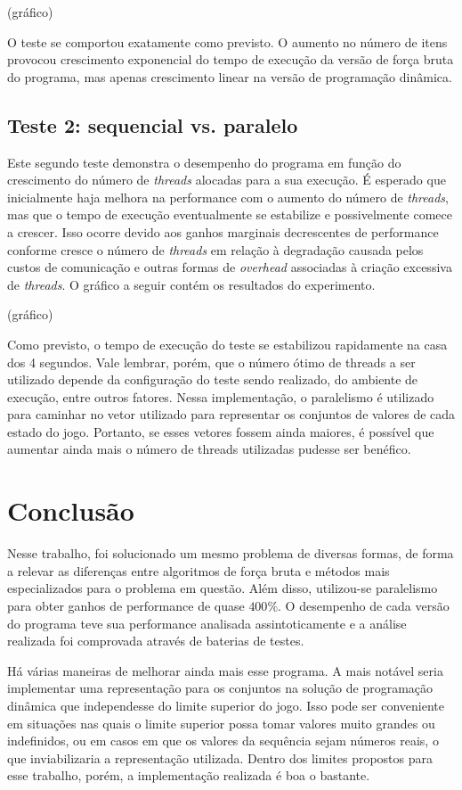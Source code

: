 \documentclass[10pt,a4paper]{article}
\numberwithin{equation}{section}
\begin{document}
(gráfico)

O teste se comportou exatamente como previsto. O aumento no número de itens provocou crescimento exponencial do tempo de execução da versão de força bruta do programa, mas apenas crescimento linear na versão de programação dinâmica.

\subsection{Teste 2: sequencial vs. paralelo}

Este segundo teste demonstra o desempenho do programa em função do crescimento do número de \emph{threads} alocadas para a sua execução. É esperado que inicialmente haja melhora na performance com o aumento do número de \emph{threads}, mas que o tempo de execução eventualmente se estabilize e possivelmente comece a crescer. Isso ocorre devido aos ganhos marginais decrescentes de performance conforme cresce o número de \emph{threads} em relação à degradação causada pelos custos de comunicação e outras formas de \emph{overhead} associadas à criação excessiva de \emph{threads}. O gráfico a seguir contém os resultados do experimento.

(gráfico)

Como previsto, o tempo de execução do teste se estabilizou rapidamente na casa dos 4 segundos. Vale lembrar, porém, que o número ótimo de threads a ser utilizado depende da configuração do teste sendo realizado, do ambiente de execução, entre outros fatores. Nessa implementação, o paralelismo é utilizado para caminhar no vetor utilizado para representar os conjuntos de valores de cada estado do jogo. Portanto, se esses vetores fossem ainda maiores, é possível que aumentar ainda mais o número de threads utilizadas pudesse ser benéfico.

\section{Conclusão}

Nesse trabalho, foi solucionado um mesmo problema de diversas formas, de forma a relevar as diferenças entre algoritmos de força bruta e métodos mais especializados para o problema em questão. Além disso, utilizou-se paralelismo para obter ganhos de performance de quase $400\%$. O desempenho de cada versão do programa teve sua performance analisada assintoticamente e a análise realizada foi comprovada através de baterias de testes.

Há várias maneiras de melhorar ainda mais esse programa. A mais notável seria implementar uma representação para os conjuntos na solução de programação dinâmica que independesse do limite superior do jogo. Isso pode ser conveniente em situações nas quais o limite superior possa tomar valores muito grandes ou indefinidos, ou em casos em que os valores da sequência sejam números reais, o que inviabilizaria a representação utilizada. Dentro dos limites propostos para esse trabalho, porém, a implementação realizada é boa o bastante.
\end{document}
